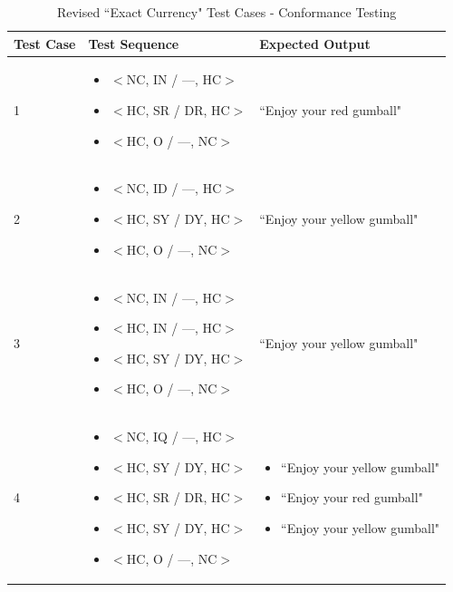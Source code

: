 \documentclass[10pt,letterpaper]{article}
\begin{document}
\pagebreak
\begin{table}[htb!]
\centering
\begin{tabularx}{13cm}{lp{5cm}p{6cm}}
\toprule
Test Case &
    Test Sequence &
    Expected Output \\ \midrule
1 &
    \begin{itemize}
        \item{$<$NC, IN / ---, HC$>$}
        \item{$<$HC, SR / DR, HC$>$}
        \item{$<$HC, O / ---, NC$>$}
    \end{itemize} &
    ``Enjoy your red gumball" \\ \midrule
2 &
    \begin{itemize}
        \item{$<$NC, ID / ---, HC$>$}
        \item{$<$HC, SY / DY, HC$>$}
        \item{$<$HC, O / ---, NC$>$}
    \end{itemize} &
    ``Enjoy your yellow gumball" \\ \midrule
3 &
    \begin{itemize}
        \item{$<$NC, IN / ---, HC$>$}
        \item{$<$HC, IN / ---, HC$>$}
        \item{$<$HC, SY / DY, HC$>$}
        \item{$<$HC, O / ---, NC$>$}
    \end{itemize} &
    ``Enjoy your yellow gumball" \\ \midrule
4 &
    \begin{itemize}
        \item{$<$NC, IQ / ---, HC$>$}
        \item{$<$HC, SY / DY, HC$>$}
        \item{$<$HC, SR / DR, HC$>$}
        \item{$<$HC, SY / DY, HC$>$}
        \item{$<$HC, O / ---, NC$>$}
    \end{itemize} &
    \begin{itemize}
        \item{``Enjoy your yellow gumball"}
        \item{``Enjoy your red gumball"}
        \item{``Enjoy your yellow gumball"}
    \end{itemize} \\ \bottomrule
\end{tabularx}
\caption{Revised ``Exact Currency" Test Cases - Conformance Testing}
\end{table}
\end{document}
